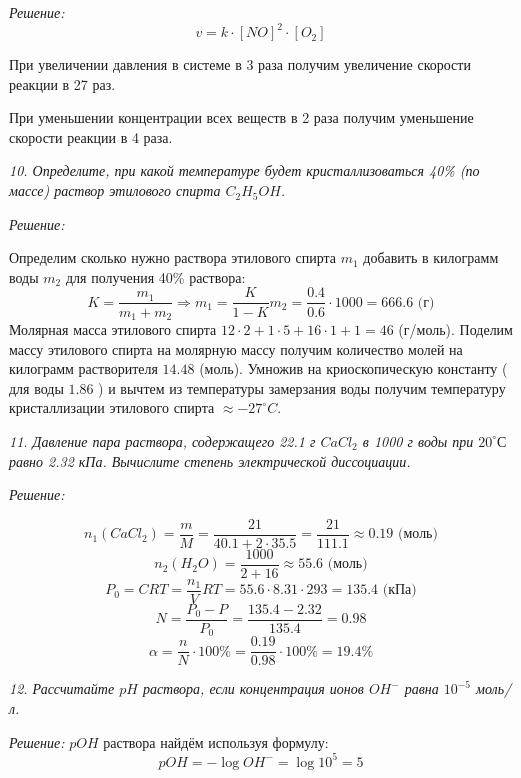 \emph{Решение:}
\[
	v = k \cdot [NO]^2 \cdot [O_2]
\]

При увеличении давления в системе в 3 раза получим увеличение скорости 
реакции в 27 раз.

При уменьшении концентрации всех веществ в 2 раза получим уменьшение 
скорости реакции в 4 раза.

\pagebreak

\emph{10. Определите, при какой температуре будет кристаллизоваться 40\% 
(по массе) раствор этилового спирта \( C_2H_5OH \).}

\emph{Решение:}

Определим сколько нужно раствора этилового спирта \( m_1 \) добавить в 
килограмм воды \( m_2 \) для получения 40\% раствора:
\[
	K = \frac{m_1}{m_1 + m_2} \Rightarrow
	m_1 = \frac{K}{1-K}m_2 = \frac{0.4}{0.6}\cdot 1000 = 666.6 
	\text{ (г)}
\]
Молярная масса этилового спирта 
\( 12 \cdot 2 + 1 \cdot 5 + 16 \cdot 1 + 1 = 46 \) (г/моль). Поделим 
массу этилового спирта на молярную массу получим количество молей на 
килограмм растворителя \( 14.48 \) (моль). Умножив на 
криоскопическую константу ( для воды \( 1.86 \) ) и вычтем из 
температуры замерзания воды получим температуру кристаллизации 
этилового спирта \( \approx -27 ^\circ C\).

\pagebreak

\emph{11. Давление пара раствора, содержащего 22.1 г \( CaCl_2 \) в 
1000 г воды при \( 20 ^{\circ}С \) равно 2.32 кПа. Вычислите степень 
электрической диссоциации.}

\emph{Решение:}

\[
	n_1(CaCl_2) = \frac{m}{M} = \frac{21}{40.1 + 2\cdot 35.5} = 
	\frac{21}{111.1} \approx 0.19 \text{ (моль)}
\]
\[
	n_2(H_2 O) = \frac{1000}{2+16} \approx 55.6 \text{ (моль)}
\]
\[
	P_0 = CRT = \frac{n_1}{V}RT = 55.6 \cdot 8.31 \cdot 293 = 
	135.4 \text{ (кПа)}
\]
\[
	N = \frac{P_0 - P}{P_0} = \frac{135.4-2.32}{135.4} = 0.98
\]
\[
	\alpha = \frac{n}{N}\cdot100\% = \frac{0.19}{0.98}\cdot100\% = 19.4\%
\]

\pagebreak

\emph{12. Рассчитайте \( pH \) раствора, если концентрация ионов 
\( OH^{-} \) равна \( 10^{-5} \) моль/л.}

\emph{Решение:}
\( pOH \) раствора найдём используя формулу:
\[
	pOH = -\log{OH^{-}} = \log{10^5} = 5
\]

